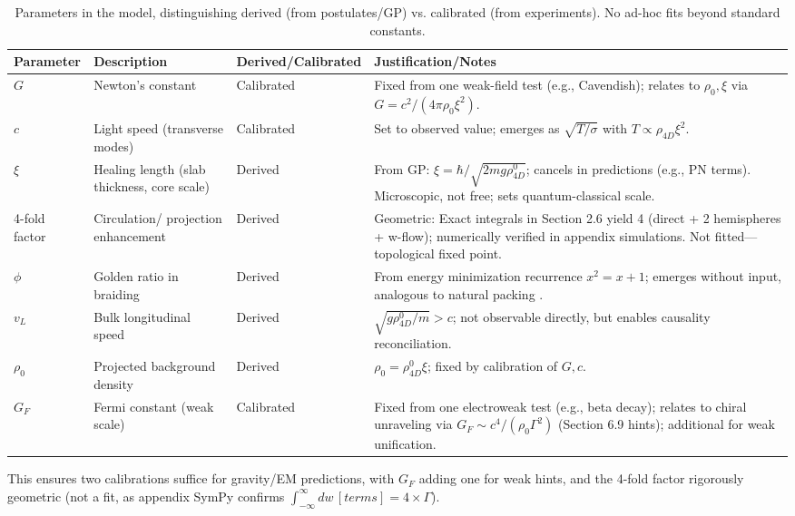 \documentclass{article}
\begin{document}
\begin{table}[H]
\centering
\small
\begin{tabularx}{\linewidth}{|p{1.5cm}|p{2cm}|l|Y|}
\hline
Parameter & Description & Derived/Calibrated & Justification/Notes \\
\hline
\(G\) & Newton's constant & Calibrated & Fixed from one weak-field test (e.g., Cavendish); relates to \(\rho_0, \xi\) via \(G = c^2 / (4\pi \rho_0 \xi^2)\). \\
\hline
\(c\) & Light speed (transverse modes) & Calibrated & Set to observed value; emerges as \(\sqrt{T / \sigma}\) with \(T \propto \rho_{4D} \xi^2\). \\
\hline
\(\xi\) & Healing length (slab thickness, core scale) & Derived & From GP: \(\xi = \hbar / \sqrt{2 m g \rho_{4D}^0}\); cancels in predictions (e.g., PN terms). Microscopic, not free; sets quantum-classical scale. \\
-fold factor & Circulation/ projection enhancement & Derived & Geometric: Exact integrals in Section 2.6 yield 4 (direct + 2 hemispheres + w-flow); numerically verified in appendix simulations. Not fitted—topological fixed point. \\
\hline
\(\phi\) & Golden ratio in braiding & Derived & From energy minimization recurrence \(x^2 = x + 1\); emerges without input, analogous to natural packing \cite{svancara2024rotating}. \\
\hline
\(v_L\) & Bulk longitudinal speed & Derived & \(\sqrt{g \rho_{4D}^0 / m} > c\); not observable directly, but enables causality reconciliation. \\
\hline
\(\rho_0\) & Projected background density & Derived & \(\rho_0 = \rho_{4D}^0 \xi\); fixed by calibration of \(G, c\). \\
\hline
\(G_F\) & Fermi constant (weak scale) & Calibrated & Fixed from one electroweak test (e.g., beta decay); relates to chiral unraveling via \(G_F \sim c^4 / (\rho_0 \Gamma^2)\) (Section 6.9 hints); additional for weak unification. \\
\hline
\end{tabularx}
\caption{Parameters in the model, distinguishing derived (from postulates/GP) vs. calibrated (from experiments). No ad-hoc fits beyond standard constants.}
\label{tab:parameters}
\end{table}

This ensures two calibrations suffice for gravity/EM predictions, with \(G_F\) adding one for weak hints, and the 4-fold factor rigorously geometric (not a fit, as appendix SymPy confirms \(\int_{-\infty}^\infty dw \, [terms] = 4 \times \Gamma\)).
\end{document}
